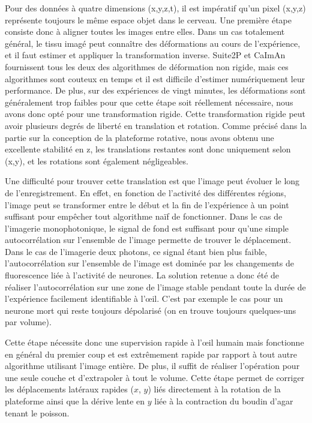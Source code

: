 Pour des données à quatre dimensions (x,y,z,t), il est impératif qu'un pixel (x,y,z) représente toujours le même espace objet dans le cerveau. Une première étape consiste donc à aligner toutes les images entre elles. Dans un cas totalement général, le tissu imagé peut connaître des déformations au cours de l'expérience, et il faut estimer et appliquer la transformation inverse. Suite2P et CaImAn fournissent tous les deux des algorithmes de déformation non rigide, mais ces algorithmes sont couteux en temps et il est difficile d'estimer numériquement leur performance. De plus, sur des expériences de vingt minutes, les déformations sont généralement trop faibles pour que cette étape soit réellement nécessaire, nous avons donc opté pour une transformation rigide. Cette transformation rigide peut avoir plusieurs degrés de liberté en translation et rotation. Comme précisé dans la partie sur la conception de la plateforme rotative, nous avons obtenu une excellente stabilité en z, les translations restantes sont donc uniquement selon (x,y), et les rotations sont également négligeables. 

Une difficulté pour trouver cette translation est que l'image peut évoluer le long de l'enregistrement. En effet, en fonction de l'activité des différentes régions, l'image peut se transformer entre le début et la fin de l'expérience à un point suffisant pour empêcher tout algorithme naïf de fonctionner. Dans le cas de l'imagerie monophotonique, le signal de fond est suffisant pour qu'une simple autocorrélation sur l'ensemble de l'image permette de trouver le déplacement. Dans le cas de l'imagerie deux photons, ce signal étant bien plus faible, l'autocorrélation sur l'ensemble de l'image est dominée par les changements de fluorescence liée à l'activité de neurones. La solution retenue a donc été de réaliser l'autocorrélation sur une zone de l'image stable pendant toute la durée de l'expérience facilement identifiable à l'œil. C'est par exemple le cas pour un neurone mort qui reste toujours dépolarisé (on en trouve toujours quelques-uns par volume).

Cette étape nécessite donc une supervision rapide à l'œil humain mais fonctionne en général du premier coup et est extrêmement rapide par rapport à tout autre algorithme utilisant l'image entière. De plus, il suffit de réaliser l'opération pour une seule couche et d'extrapoler à tout le volume. Cette étape permet de corriger les déplacements latéraux rapides ($x$, $y$) liés directement à la rotation de la plateforme ainsi que la dérive lente en $y$ liée à la contraction du boudin d'agar tenant le poisson.

